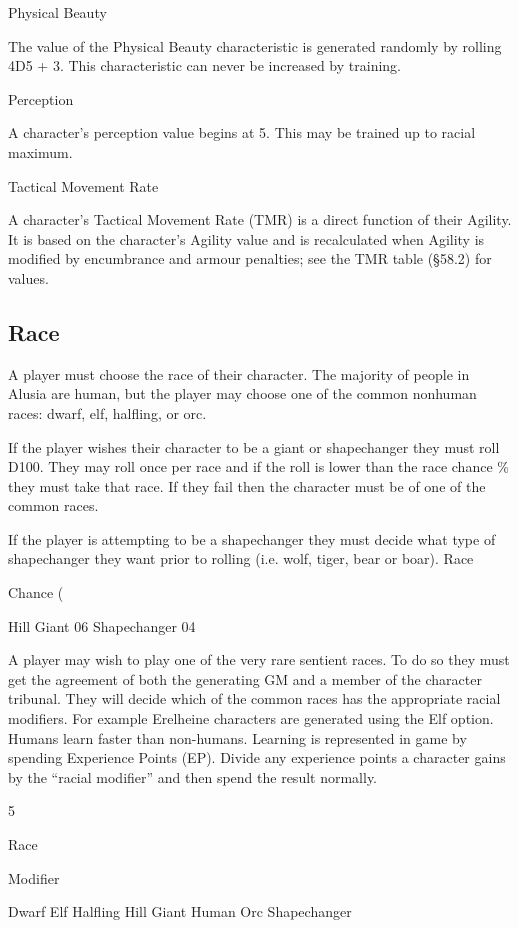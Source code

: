 \documentclass[a4paper]{article}
\begin{document}
\begin{multicols}{3}
Physical Beauty

The value of the Physical Beauty characteristic is generated randomly
by rolling 4D5 + 3. This characteristic can never be increased by
training.

Perception

A character’s perception value begins at 5. This may be trained up to
racial maximum.

Tactical Movement Rate

A character’s Tactical Movement Rate (TMR) is a direct function of
their Agility. It is based on the character’s Agility value and is
recalculated when Agility is modified by encumbrance and armour
penalties; see the TMR table (§58.2) for values.

\subsection{Race}

A player must choose the race of their character.  The majority of
people in Alusia are human, but the player may choose one of the
common nonhuman races: dwarf, elf, halfling, or orc.

If the player wishes their character to be a giant or shapechanger
they must roll D100. They may roll once per race and if the roll is
lower than the race chance \% they must take that race. If they fail
then the character must be of one of the common races.

If the player is attempting to be a shapechanger they must decide what
type of shapechanger they want prior to rolling (i.e. wolf, tiger,
bear or boar).  Race

Chance (%

Hill Giant
06
Shapechanger 04

A player may wish to play one of the very rare sentient races. To do
so they must get the agreement of both the generating GM and a member
of the character tribunal. They will decide which of the common races
has the appropriate racial modifiers. For example Erelheine characters
are generated using the Elf option.  Humans learn faster than
non-humans. Learning is represented in game by spending Experience
Points (EP). Divide any experience points a character gains by the
“racial modifier” and then spend the result normally.

5

Race

Modifier

Dwarf
Elf
Halfling
Hill Giant
Human
Orc
Shapechanger


\end{multicols}
\end{document}
